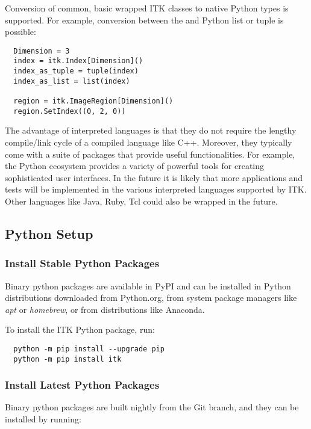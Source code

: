 Conversion of common, basic wrapped ITK classes to native Python types is
supported. For example, conversion between the  and Python list
or tuple is possible:

\small
\begin{verbatim}
  Dimension = 3
  index = itk.Index[Dimension]()
  index_as_tuple = tuple(index)
  index_as_list = list(index)

  region = itk.ImageRegion[Dimension]()
  region.SetIndex((0, 2, 0))
\end{verbatim}
\normalsize

The advantage of interpreted languages is that they do not require the lengthy
compile/link cycle of a compiled language like C++. Moreover, they typically
come with a suite of packages that provide useful functionalities. For example,
the Python ecosystem provides a variety of powerful tools for creating
sophisticated user interfaces. In the future it is likely that more
applications and tests will be implemented in the various interpreted
languages supported by ITK. Other languages like Java, Ruby, Tcl could also be
wrapped in the future.

\subsection{Python Setup}

\subsubsection{Install Stable Python Packages}

Binary python packages are available in PyPI and can be installed in Python
distributions downloaded from Python.org, from system package managers like
\textit{apt} or \textit{homebrew}, or from distributions like Anaconda.

To install the ITK Python package, run:

\small
\begin{verbatim}
  python -m pip install --upgrade pip
  python -m pip install itk
\end{verbatim}
\normalsize

\subsubsection{Install Latest Python Packages}

Binary python packages are built nightly from the Git  branch,
and they can be installed by running:

